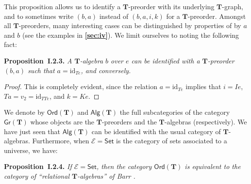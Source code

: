 \documentclass[fleqn]{article}
\newenvironment{itenv}[1]
  {\phantomsection\par\medskip\noindent\textbf{#1.}\itshape}
  {\par\medskip}
\newcommand{\oldpage}[1]{\marginpar{\footnotesize$\Big\vert$ \textit{p.~#1}}}
\newcommand{\unsure}[1]{{\color{purple}\textbf{#1}}}
\newcommand{\id}{\mathrm{id}}
\newcommand{\TT}{\mathbf{T}}
\newcommand{\cat}[1]{\mathcal{#1}}
\newcommand{\Cat}[1]{\mathsf{#1}}
\newcommand{\Gr}[1]{\Cat{Gr}(#1)}
\newcommand{\Alg}[1]{\Cat{Alg}(#1)}
\newcommand{\Ord}[1]{\Cat{Ord}(#1)}
\begin{document}
This proposition allows us to identify a $\TT$-preorder with its underlying $\TT$-graph, and to sometimes write $(b,a)$ instead of $(b,a,i,k)$ for a $\TT$-preorder.
Amongst all $\TT$-preorders, many interesting cases can be distinguished by properties of by $a$ and $b$ (see the examples in \unsure{\cref{sec:iv}}).
We limit ourselves to noting the following fact:

\begin{itenv}{Proposition~I.2.3}
  A $\TT$-algebra $b$ over $e$ can be identified with a $\TT$-preorder $(b,a)$ such that $a=\id_{Te}$, and conversely.
\end{itenv}

\begin{proof}
  This is completely evident, since the relation $a=\id_{Te}$ implies that $i=Ie$, $Ta=v_2=\id_{TTe}$, and $k=Ke$.
\end{proof}

\oldpage{231}
We denote by $\Ord{\TT}$ and $\Alg{\TT}$ the full subcategories of the category $\Gr{\TT}$ whose objects are the $\TT$-preorders and the $\TT$-algebras (respectively).
We have just seen that $\Alg{\TT}$ can be identified with the usual category of $\TT$-algebras.
Furthermore, when $\cat{E}=\Cat{Set}$ is the category of sets associated to a universe, we have:

\begin{itenv}{Proposition~I.2.4}
\label{proposition:i.2.4}
  If $\cat{E}=\Cat{Set}$, then the category $\Ord{\TT}$ is equivalent to the category of ``relational $\TT$-algebras'' of Barr {\cite{Ba}}.
\end{itenv}
\end{document}
